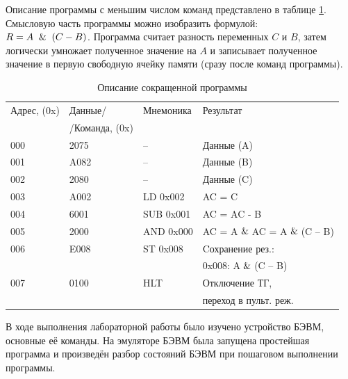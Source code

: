 Описание программы с меньшим числом команд представлено в таблице \ref{tab:optimized}.
Смысловую часть программы можно изобразить формулой:\\ $R=A\And(C-B)$. Программа считает разность переменных $C$ и $B$, затем логически умножает полученное значение на $A$ и записывает полученное значение в первую свободную ячейку памяти (сразу после команд программы).

\begin{table}[htbp]
    \renewcommand{\arraystretch}{1.2} %
    \centering
    \begin{tabular}{|l|l|l|l|}
            \hline
           Адрес, (0x)   & Данные/      & Мнемоника & Результат\\
                         & /Команда, (0x)&           &          \\\hline
           000 &    2075 & --           & Данные (A)\\\hline
           001 &    A082 & --           & Данные (B)\\\hline
           002 &    2080 & --           & Данные (C)\\\hline
           003 &    A002 & LD 0x002     & AC = C \\\hline
           004 &    6001 & SUB 0x001    & AC = AC - B \\\hline
           005 &    2000 & AND 0x000    & AC = A$\And$AC = A$\And$(C -- B)\\\hline
           006 &    E008 & ST 0x008     & Cохранение рез.: \\
               &         &              & 0x008: A$\And$(C -- B)\\\hline
           007 &    0100 & HLT          & Отключение ТГ,\\
               &         &              & переход в пульт. реж. \\\hline
    \end{tabular}
    \caption{Описание сокращенной программы}
    \label{tab:optimized}
\end{table}





В ходе выполнения лабораторной работы было изучено устройство БЭВМ, основные её команды. На  эмуляторе БЭВМ была запущена простейшая программа и произведён разбор состояний БЭВМ при  пошаговом выполнении программы.\\
\newpage





